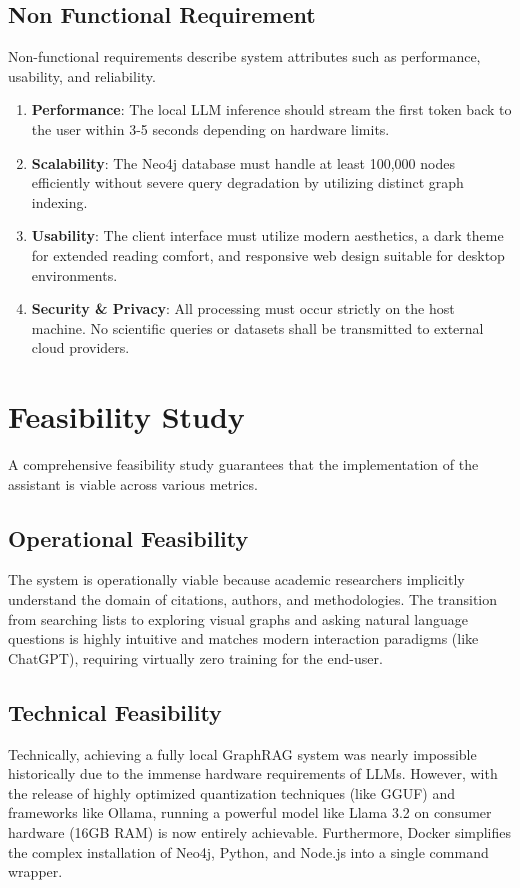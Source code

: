 \documentclass[12pt,a4paper]{report}
\begin{document}
\subsection{Non Functional Requirement}
Non-functional requirements describe system attributes such as performance, usability, and reliability.
\begin{enumerate}
    \item \textbf{Performance}: The local LLM inference should stream the first token back to the user within 3-5 seconds depending on hardware limits. 
    \item \textbf{Scalability}: The Neo4j database must handle at least 100,000 nodes efficiently without severe query degradation by utilizing distinct graph indexing.
    \item \textbf{Usability}: The client interface must utilize modern aesthetics, a dark theme for extended reading comfort, and responsive web design suitable for desktop environments.
    \item \textbf{Security \& Privacy}: All processing must occur strictly on the host machine. No scientific queries or datasets shall be transmitted to external cloud providers.
\end{enumerate}

\section{Feasibility Study}
A comprehensive feasibility study guarantees that the implementation of the assistant is viable across various metrics.

\subsection{Operational Feasibility}
The system is operationally viable because academic researchers implicitly understand the domain of citations, authors, and methodologies. The transition from searching lists to exploring visual graphs and asking natural language questions is highly intuitive and matches modern interaction paradigms (like ChatGPT), requiring virtually zero training for the end-user.

\subsection{Technical Feasibility}
Technically, achieving a fully local GraphRAG system was nearly impossible historically due to the immense hardware requirements of LLMs. However, with the release of highly optimized quantization techniques (like GGUF) and frameworks like Ollama, running a powerful model like Llama 3.2 on consumer hardware (16GB RAM) is now entirely achievable. Furthermore, Docker simplifies the complex installation of Neo4j, Python, and Node.js into a single command wrapper.
\end{document}
